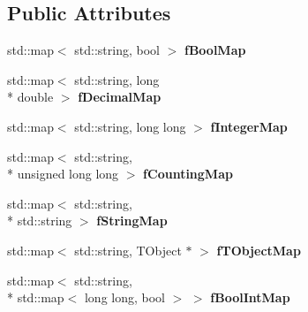 \subsection*{Public Attributes}
\begin{DoxyCompactItemize}
\item 
\hypertarget{class_h_a_l_1_1_analysis_data_a57ac00f9dc144b1f45a1065a7012f210}{std\-::map$<$ std\-::string, bool $>$ {\bfseries f\-Bool\-Map}}\label{class_h_a_l_1_1_analysis_data_a57ac00f9dc144b1f45a1065a7012f210}

\item 
\hypertarget{class_h_a_l_1_1_analysis_data_aa404a827832c0e22bca564692522e13c}{std\-::map$<$ std\-::string, long \\*
double $>$ {\bfseries f\-Decimal\-Map}}\label{class_h_a_l_1_1_analysis_data_aa404a827832c0e22bca564692522e13c}

\item 
\hypertarget{class_h_a_l_1_1_analysis_data_abfa0490da901900f2fc7a2686e98db87}{std\-::map$<$ std\-::string, long long $>$ {\bfseries f\-Integer\-Map}}\label{class_h_a_l_1_1_analysis_data_abfa0490da901900f2fc7a2686e98db87}

\item 
\hypertarget{class_h_a_l_1_1_analysis_data_ab8fa4640511df8754f489a7d4244de78}{std\-::map$<$ std\-::string, \\*
unsigned long long $>$ {\bfseries f\-Counting\-Map}}\label{class_h_a_l_1_1_analysis_data_ab8fa4640511df8754f489a7d4244de78}

\item 
\hypertarget{class_h_a_l_1_1_analysis_data_a2764abf567f8615708b1b9e33e4a0dfc}{std\-::map$<$ std\-::string, \\*
std\-::string $>$ {\bfseries f\-String\-Map}}\label{class_h_a_l_1_1_analysis_data_a2764abf567f8615708b1b9e33e4a0dfc}

\item 
\hypertarget{class_h_a_l_1_1_analysis_data_a74757d81af57b2a674777034ba3f76eb}{std\-::map$<$ std\-::string, T\-Object $\ast$ $>$ {\bfseries f\-T\-Object\-Map}}\label{class_h_a_l_1_1_analysis_data_a74757d81af57b2a674777034ba3f76eb}

\item 
\hypertarget{class_h_a_l_1_1_analysis_data_a219829938ca657327bc46d9901172669}{std\-::map$<$ std\-::string, \\*
std\-::map$<$ long long, bool $>$ $>$ {\bfseries f\-Bool\-Int\-Map}}\label{class_h_a_l_1_1_analysis_data_a219829938ca657327bc46d9901172669}


\end{DoxyCompactItemize}
